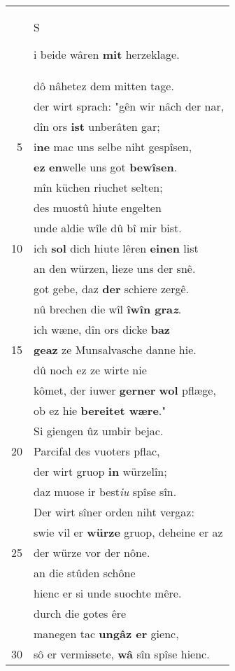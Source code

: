 \documentclass[8pt,a4paper,notitlepage]{article}
\begin{document}
\begin{table}[ht]
\begin{minipage}[t]{0.5\linewidth}
\begin{tabular}{rl}
 & \begin{large}S\end{large}i beide wâren \textbf{mit} herzeklage.\\ 
 & dô nâhetez dem mitten tage.\\ 
 & der wirt sprach: "gên wir nâch der nar,\\ 
 & dîn ors \textbf{ist} unberâten gar;\\ 
5 & i\textbf{ne} mac uns selbe niht gespîsen,\\ 
 & \textbf{ez} \textbf{en}welle uns got \textbf{bewîsen}.\\ 
 & mîn küchen riuchet selten;\\ 
 & des muostû hiute engelten\\ 
 & unde aldie wîle dû bî mir bist.\\ 
10 & ich \textbf{sol} dich hiute lêren \textbf{einen} list\\ 
 & an den würzen, lieze uns der snê.\\ 
 & got gebe, daz \textbf{der} schiere zergê.\\ 
 & nû brechen die wîl \textbf{îwîn gra\textit{z}}.\\ 
 & ich wæne, dîn ors dicke \textbf{baz}\\ 
15 & \textbf{geaz} ze Munsalvasche danne hie.\\ 
 & dû noch ez ze wirte nie\\ 
 & kômet, der iuwer \textbf{gerner} \textbf{wol} pflæge,\\ 
 & ob ez hie \textbf{bereitet wære}."\\ 
 & Si giengen ûz umbir bejac.\\ 
20 & Parcifal des vuoters pflac,\\ 
 & der wirt gruop \textbf{in} würzelîn;\\ 
 & daz muose ir best\textit{iu} spîse sîn.\\ 
 & Der wirt sîner orden niht vergaz:\\ 
 & swie vil er \textbf{würze} gruop, deheine er az\\ 
25 & der würze vor der nône.\\ 
 & an die stûden schône\\ 
 & hienc er si unde suochte mêre.\\ 
 & durch die gotes êre\\ 
 & manegen tac \textbf{ungâz er} gienc,\\ 
30 & sô er vermissete, \textbf{wâ} sîn spîse hienc.\\ 
\end{tabular}

\end{minipage}
\end{table}
\end{document}
